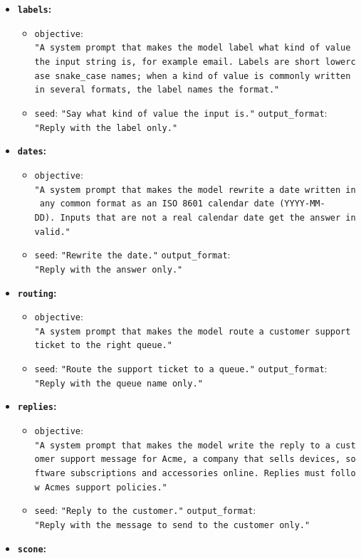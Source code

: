 \documentclass[10pt]{article}
\providecommand{\tightlist}{%
  \setlength{\itemsep}{0pt}\setlength{\parskip}{0pt}}
\begin{document}
\begin{itemize}
\tightlist
\item
  \textbf{\texttt{labels}:}

  \begin{itemize}
  \tightlist
  \item
    \texttt{objective}:
    \texttt{"A\ system\ prompt\ that\ makes\ the\ model\ label\ what\ kind\ of\ value\ the\ input\ string\ is,\ for\ example\ email.\ Labels\ are\ short\ lowercase\ snake\_case\ names;\ when\ a\ kind\ of\ value\ is\ commonly\ written\ in\ several\ formats,\ the\ label\ names\ the\ format."}
  \item
    \texttt{seed}:
    \texttt{"Say\ what\ kind\ of\ value\ the\ input\ is."} \textbar{}
    \texttt{output\_format}: \texttt{"Reply\ with\ the\ label\ only."}
  \end{itemize}
\item
  \textbf{\texttt{dates}:}

  \begin{itemize}
  \tightlist
  \item
    \texttt{objective}:
    \texttt{"A\ system\ prompt\ that\ makes\ the\ model\ rewrite\ a\ date\ written\ in\ any\ common\ format\ as\ an\ ISO\ 8601\ calendar\ date\ (YYYY-MM-DD).\ Inputs\ that\ are\ not\ a\ real\ calendar\ date\ get\ the\ answer\ invalid."}
  \item
    \texttt{seed}: \texttt{"Rewrite\ the\ date."} \textbar{}
    \texttt{output\_format}: \texttt{"Reply\ with\ the\ answer\ only."}
  \end{itemize}
\item
  \textbf{\texttt{routing}:}

  \begin{itemize}
  \tightlist
  \item
    \texttt{objective}:
    \texttt{"A\ system\ prompt\ that\ makes\ the\ model\ route\ a\ customer\ support\ ticket\ to\ the\ right\ queue."}
  \item
    \texttt{seed}: \texttt{"Route\ the\ support\ ticket\ to\ a\ queue."}
    \textbar{} \texttt{output\_format}:
    \texttt{"Reply\ with\ the\ queue\ name\ only."}
  \end{itemize}
\item
  \textbf{\texttt{replies}:}

  \begin{itemize}
  \tightlist
  \item
    \texttt{objective}:
    \texttt{"A\ system\ prompt\ that\ makes\ the\ model\ write\ the\ reply\ to\ a\ customer\ support\ message\ for\ Acme,\ a\ company\ that\ sells\ devices,\ software\ subscriptions\ and\ accessories\ online.\ Replies\ must\ follow\ Acme\textquotesingle{}s\ support\ policies."}
  \item
    \texttt{seed}: \texttt{"Reply\ to\ the\ customer."} \textbar{}
    \texttt{output\_format}:
    \texttt{"Reply\ with\ the\ message\ to\ send\ to\ the\ customer\ only."}
  \end{itemize}
\item
  \textbf{\texttt{scone}:}


\end{itemize}
\end{document}
